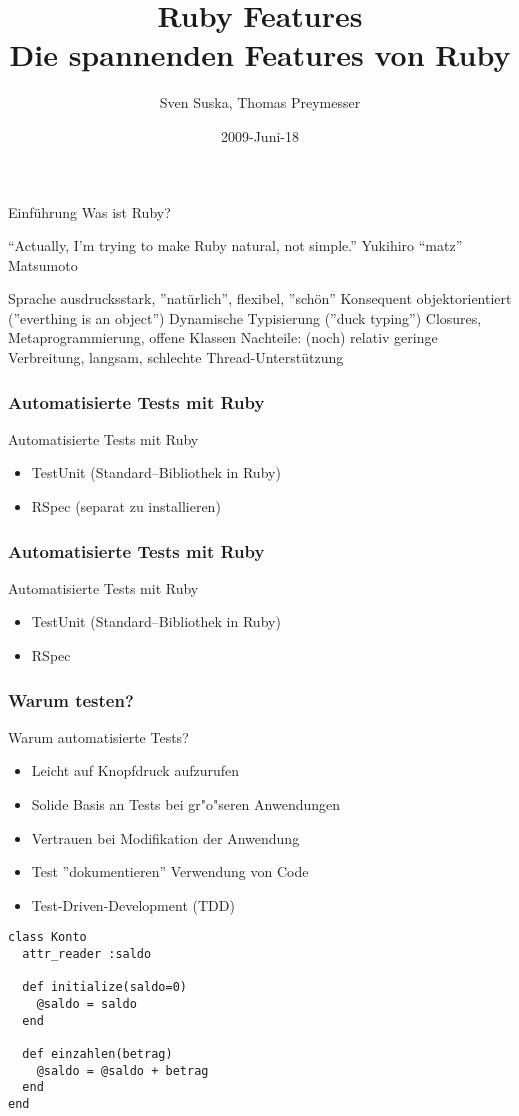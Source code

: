 \documentclass{beamer}
\title[Ruby]{Ruby Features\\Die spannenden Features von Ruby}
\author{Sven Suska, Thomas Preymesser}
\date{2009-Juni-18}
\begin{document}
\lstset{language=Ruby}
\begin{frame}
\titlepage
\end{frame}


\begin{frame}{Einführung}
Was ist Ruby?

“Actually, I'm trying to make Ruby natural, not simple.”
Yukihiro “matz” Matsumoto

Sprache ausdrucksstark, ”natürlich”, flexibel, ”schön”
Konsequent objektorientiert (”everthing is an object”)
Dynamische Typisierung (”duck typing”)
Closures, Metaprogrammierung, offene Klassen
Nachteile: (noch) relativ geringe Verbreitung, langsam, 
schlechte Thread-Unterstützung

\end{frame}

\begin{frame}
  \frametitle{Automatisierte Tests mit Ruby}
  Automatisierte Tests mit Ruby
  \begin{itemize}
    \item<1-> TestUnit (Standard--Bibliothek in Ruby)
    \item<2-> RSpec (separat zu installieren)
  \end{itemize}
\end{frame}

\begin{frame}
  \frametitle{Automatisierte Tests mit Ruby}
  Automatisierte Tests mit Ruby
  \begin{itemize}
    \item TestUnit (Standard--Bibliothek in Ruby)
    \pause
    \item RSpec 
  \end{itemize}
\end{frame}

\begin{frame}

 \frametitle{Warum testen?}
  Warum automatisierte Tests?
  \begin{itemize}
    \item Leicht auf Knopfdruck aufzurufen
    \item Solide Basis an Tests bei gr"o"seren Anwendungen
    \item Vertrauen bei Modifikation der Anwendung
    \item Test ''dokumentieren'' Verwendung von Code
    \item Test-Driven-Development (TDD)
  \end{itemize}
\end{frame}

\begin{frame}[containsverbatim]
  \begin{lstlisting}[fragile,frame=single,caption={konto.rb}]
class Konto
  attr_reader :saldo
  
  def initialize(saldo=0)
    @saldo = saldo
  end
    
  def einzahlen(betrag)
    @saldo = @saldo + betrag
  end
end
  \end{lstlisting}
\end{frame}
\end{document}

